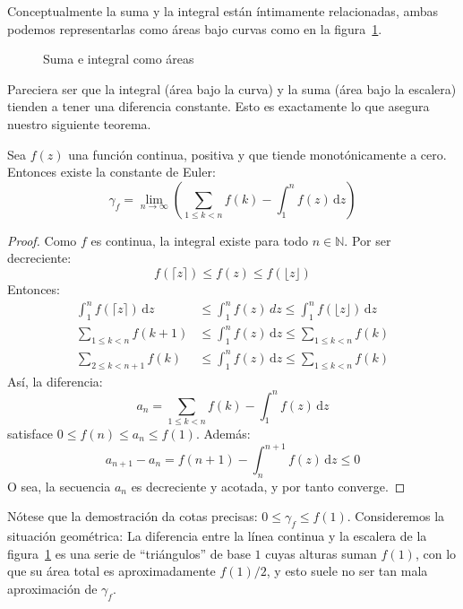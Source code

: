   Conceptualmente la suma y la integral
  están íntimamente relacionadas,
  ambas podemos representarlas como áreas bajo curvas
  como en la figura~\ref{fig:fz}.
  \begin{figure}[htbp]
    \centering
    \caption{Suma e integral como áreas}
    \label{fig:fz}
  \end{figure}
  Pareciera ser que la integral (área bajo la curva)
  y la suma (área bajo la escalera)
  tienden a tener una diferencia constante.
  Esto es exactamente lo que asegura nuestro siguiente teorema.
  \begin{theorem}
    \label{theo:maclaurin-Cauchy}
    Sea \(f(z)\) una función continua,
    positiva
    y que tiende monotónicamente a cero.
    Entonces existe la constante de Euler:%
    \begin{equation*}
      \gamma_f
	= \lim_{n \rightarrow \infty}
	    \left(
	      \sum_{1 \le k < n} f(k) - \int_1^n f(z)
					  \, \mathrm{d} z
	    \right)
    \end{equation*}
  \end{theorem}
  \begin{proof}
    Como \(f\) es continua,
    la integral existe para todo \(n \in \mathbb{N}\).
    Por ser decreciente:
    \begin{equation*}
      f(\lceil z \rceil)
	\le f(z)
	\le f(\lfloor z \rfloor)
    \end{equation*}
    Entonces:
    \begin{align*}
      \int_1^n	f(\lceil z \rceil) \, \mathrm{d} z
	&\le \int_1^n f(z) \, d z
	\le \int_1^n f( \lfloor z \rfloor ) \, \mathrm{d} z \\
      \sum_{1 \le k < n} f(k + 1)
	&\le \int_1^n f(z) \, \mathrm{d} z
	\le \sum_{1 \le k < n}	f(k) \\
      \sum_{2 \le k < n + 1} f(k)
	&\le \int_1^n f(z) \, \mathrm{d} z
	\le \sum_{1 \le k < n} f(k)
    \end{align*}
    Así,
    la diferencia:
    \begin{equation*}
      a_n
	= \sum_{1 \le k < n} f(k) - \int_1^n f(z) \, \mathrm{d} z
    \end{equation*}
    satisface \(0 \le f(n) \le a_n \le f(1)\).
    Además:
    \begin{equation*}
      a_{n + 1} - a_n
	= f(n + 1) - \int_n^{n + 1} f(z) \, \mathrm{d} z
	\le 0
    \end{equation*}
    O sea,
    la secuencia \(a_n\) es decreciente y acotada,
    y por tanto converge.
  \end{proof}
  Nótese que la demostración da cotas precisas:
  \(0 \le \gamma_f \le f(1)\).
  Consideremos la situación geométrica:
  La diferencia entre la línea continua y la escalera
  de la figura~\ref{fig:fz}
  es una serie de ``triángulos''
  de base \(1\) cuyas alturas suman \(f(1)\),
  con lo que su área total es aproximadamente \(f(1) / 2\),
  y esto suele no ser tan mala aproximación de \(\gamma_f\).

